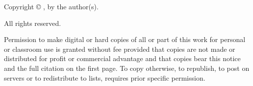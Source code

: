 \clearpage
\thispagestyle{empty}
\vspace*{3in}

\begin{center}
Copyright \copyright{} \the\year, by the author(s).

All rights reserved.
\end{center}

\noindent
Permission to make digital or hard copies of all or part of this work for personal or classroom use is granted without fee provided that copies are not made or distributed for profit or commercial advantage and that copies bear this notice and the full citation on the first page. To copy otherwise, to republish, to post on servers or to redistribute to lists, requires prior specific permission.